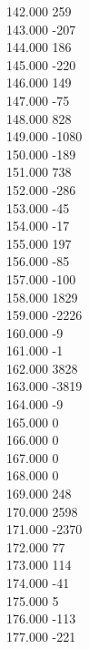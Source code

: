 { 142.000	259 \\
 143.000	-207 \\
 144.000	186 \\
 145.000	-220 \\
 146.000	149 \\
 147.000	-75 \\
 148.000	828 \\
 149.000	-1080 \\
 150.000	-189 \\
 151.000	738 \\
 152.000	-286 \\
 153.000	-45 \\
 154.000	-17 \\
 155.000	197 \\
 156.000	-85 \\
 157.000	-100 \\
 158.000	1829 \\
 159.000	-2226 \\
 160.000	-9 \\
 161.000	-1 \\
 162.000	3828 \\
 163.000	-3819 \\
 164.000	-9 \\
 165.000	0 \\
 166.000	0 \\
 167.000	0 \\
 168.000	0 \\
 169.000	248 \\
 170.000	2598 \\
 171.000	-2370 \\
 172.000	77 \\
 173.000	114 \\
 174.000	-41 \\
 175.000	5 \\
 176.000	-113 \\
 177.000	-221 \\
}
